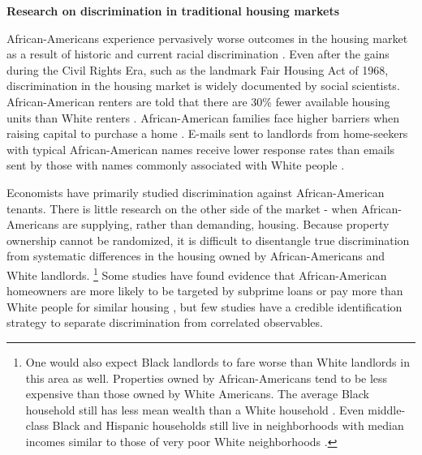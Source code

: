 \vspace{5mm}
\textbf{Research on discrimination in traditional housing markets}

African-Americans experience pervasively worse outcomes in the housing market as a result of historic and current racial discrimination \citep{krysan}. Even after the gains during the Civil Rights Era, such as the landmark Fair Housing Act of 1968, discrimination in the housing market is widely documented by social scientists. African-American renters are told that there are 30\% fewer available housing units than White renters \citep{yinger1}. African-American families face higher barriers when raising capital to purchase a home \citep{pope}. E-mails sent to landlords from home-seekers with typical African-American names receive lower response rates than emails sent by those with names commonly associated with White people \citep{hanson}.

Economists have primarily studied discrimination against African-American tenants. There is little research on the other side of the market - when African-Americans are supplying, rather than demanding, housing. Because property ownership cannot be randomized, it is difficult to disentangle true discrimination from systematic differences in the housing owned by African-Americans and White landlords.%
	\footnote{One would also expect Black landlords to fare worse than White landlords in this area as well. Properties owned by African-Americans tend to be less expensive than those owned by White Americans. The average Black household still has less mean wealth than a White household \citep{oliver}. Even middle-class Black and Hispanic households still live in neighborhoods with median incomes similar to those of very poor White neighborhoods \citep{reardon}.} 
Some studies have found evidence that African-American homeowners are more likely to be targeted by subprime loans \citep{foreclosure} or pay more than White people for similar housing \citep{bayer, myers}, but few studies have a credible identification strategy to separate discrimination from correlated observables. 





